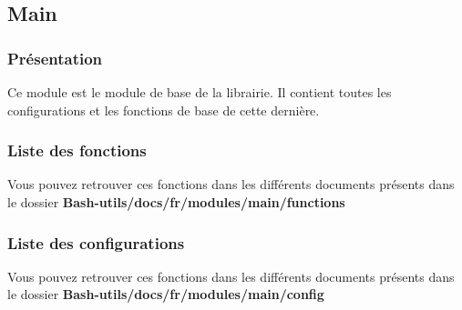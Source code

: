 \documentclass[a4paper,10pt]{article}
\begin{document}
  \color{green}
  \subsection{Main}\color{white}

  \color{blue}
  \subsubsection{Présentation}\color{white}
  Ce module est le module de base de la librairie. Il contient toutes les configurations et les fonctions de base de cette dernière.

  \color{blue}
  \subsubsection{Liste des fonctions}\color{white}
  Vous pouvez retrouver ces fonctions dans les différents documents présents dans le dossier \textbf{\color{lime}Bash-utils/docs/fr/modules/main/functions\color{white}}

  \color{blue}
  \subsubsection{Liste des configurations}\color{white}
  Vous pouvez retrouver ces fonctions dans les différents documents présents dans le dossier \textbf{\color{lime}Bash-utils/docs/fr/modules/main/config\color{white}}
    
\end{document}
